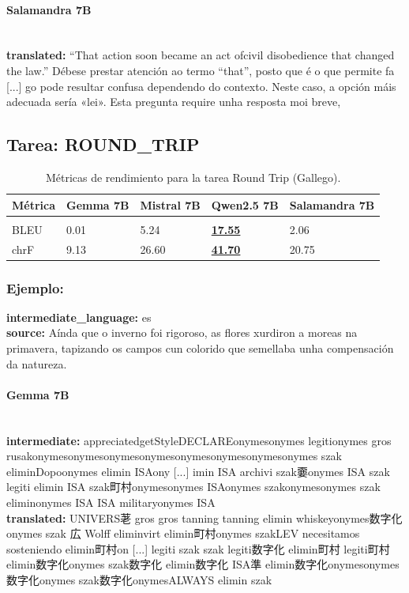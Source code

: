 \paragraph{Salamandra 7B}~\\
\textbf{translated:} “That action soon became an act ofcivil disobedience that changed the law.”  Débese prestar atención ao termo “that”, posto que é o que permite fa [...] go pode resultar confusa dependendo do contexto. Neste caso, a opción máis adecuada sería «lei».    Esta pregunta require unha resposta moi breve,

\subsection{Tarea: ROUND\_TRIP}\label{tarea-round_trip}
\begin{longtable}[]{@{}lllll@{}}
\toprule\noalign{}
Métrica & Gemma 7B & Mistral 7B & Qwen2.5 7B & Salamandra 7B \\
\midrule\noalign{}
\endhead
\bottomrule\noalign{}
\caption{Métricas de rendimiento para la tarea Round Trip (Gallego).}
\label{tab:metricas_round_trip_Gallego}\\
\endlastfoot
BLEU & 0.01 & 5.24 & \textbf{\underline{17.55}} & 2.06 \\
chrF & 9.13 & 26.60 & \textbf{\underline{41.70}} & 20.75 \\
\end{longtable}

\subsubsection{Ejemplo:}
\textbf{intermediate\_language:} es\\
\textbf{source:} Aínda que o inverno foi rigoroso, as flores xurdiron a moreas na primavera, tapizando os campos cun colorido que semellaba unha compensación da natureza. 

\paragraph{Gemma 7B}~\\
\textbf{intermediate:} appreciatedgetStyleDECLAREonymesonymes legitionymes gros rusakonymesonymesonymesonymesonymesonymesonymesonymes szak eliminDopoonymes elimin ISAony [...] imin ISA archivi szak嫑onymes ISA szak legiti elimin ISA szak町村onymesonymes ISAonymes szakonymesonymes szak eliminonymes ISA ISA militaryonymes ISA\\
\textbf{translated:} UNIVERS荖 gros gros tanning tanning elimin whiskeyonymes数字化onymes szak 広 Wolff eliminvirt elimin町村onymes szakLEV necesitamos sosteniendo elimin町村on [...] legiti szak szak legiti数字化 elimin町村 legiti町村 elimin数字化onymes szak数字化 elimin数字化 ISA準 elimin数字化onymesonymes数字化onymes szak数字化onymesALWAYS elimin szak

